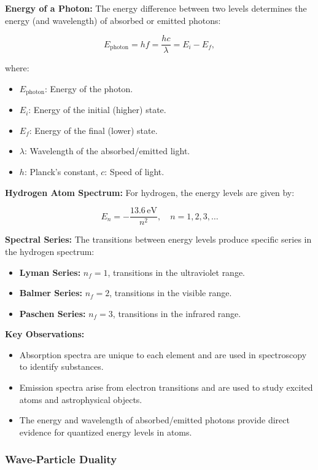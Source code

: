 \documentclass{article}
\newcommand{\eqbox}[1]{\begin{tcolorbox}[colback=gray!10] #1 \end{tcolorbox}}
\newcommand{\conceptbox}[1]{\begin{tcolorbox}[colback=blue!10] #1 \end{tcolorbox}}
\begin{document}
\conceptbox{
\textbf{Energy of a Photon:}
The energy difference between two levels determines the energy (and wavelength) of absorbed or emitted photons:
\eqbox{
\[
E_{\text{photon}} = hf = \frac{hc}{\lambda} = E_i - E_f,
\]
}
where:
\begin{itemize}
    \item \( E_{\text{photon}} \): Energy of the photon.
    \item \( E_i \): Energy of the initial (higher) state.
    \item \( E_f \): Energy of the final (lower) state.
    \item \( \lambda \): Wavelength of the absorbed/emitted light.
    \item \( h \): Planck's constant, \( c \): Speed of light.
\end{itemize}
}

\conceptbox{
\textbf{Hydrogen Atom Spectrum:}
For hydrogen, the energy levels are given by:
\eqbox{
\[
E_n = -\frac{13.6 \, \text{eV}}{n^2}, \quad n = 1, 2, 3, \dots
\]
}
\textbf{Spectral Series:}
The transitions between energy levels produce specific series in the hydrogen spectrum:
\begin{itemize}
    \item \textbf{Lyman Series:} \( n_f = 1 \), transitions in the ultraviolet range.
    \item \textbf{Balmer Series:} \( n_f = 2 \), transitions in the visible range.
    \item \textbf{Paschen Series:} \( n_f = 3 \), transitions in the infrared range.
\end{itemize}
}

\conceptbox{
\textbf{Key Observations:}
\begin{itemize}
    \item Absorption spectra are unique to each element and are used in spectroscopy to identify substances.
    \item Emission spectra arise from electron transitions and are used to study excited atoms and astrophysical objects.
    \item The energy and wavelength of absorbed/emitted photons provide direct evidence for quantized energy levels in atoms.
\end{itemize}
}

\newpage
\subsubsection{Wave-Particle Duality}
\end{document}
